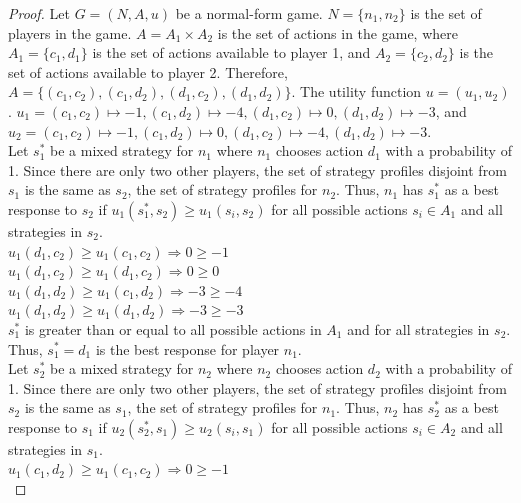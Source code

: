 \begin{proof}
  Let $G=(N, A, u)$ be a normal-form game. $N = \{n_1, n_2\}$ is the set of players in the game. $A=A_1\times A_2$ is the set of actions in the game, where $A_1=\{c_1, d_1\}$ is the set of actions available to player 1, and $A_2=\{c_2, d_2\}$ is the set of actions available to player 2. Therefore, $A=\{(c_1, c_2), (c_1, d_2), (d_1, c_2), (d_1, d_2)\}$. The utility function $u=(u_1, u_2)$. $u_1=(c_1, c_2)\mapsto -1, (c_1, d_2)\mapsto -4, (d_1, c_2)\mapsto 0, (d_1, d_2)\mapsto -3$, and $u_2=(c_1, c_2)\mapsto -1, (c_1, d_2)\mapsto 0, (d_1, c_2)\mapsto -4, (d_1, d_2)\mapsto -3$.\\

  Let $s^*_1$ be a mixed strategy for $n_1$ where $n_1$ chooses action $d_1$ with a probability of 1. Since there are only two other players, the set of strategy profiles disjoint from $s_1$ is the same as $s_2$, the set of strategy profiles for $n_2$. Thus, $n_1$ has $s^*_1$ as a best response to $s_2$ if $u_1(s^*_1, s_2)\ge u_1(s_i, s_2)$ for all possible actions $s_i\in A_1$ and all strategies in $s_2$.\\
  
  $u_1(d_1, c_2)\ge u_1(c_1, c_2) \Rightarrow 0\ge -1$\\
  
  $u_1(d_1, c_2)\ge u_1(d_1, c_2) \Rightarrow 0\ge 0$\\

  $u_1(d_1, d_2)\ge u_1(c_1, d_2) \Rightarrow -3\ge -4$\\

  $u_1(d_1, d_2)\ge u_1(d_1, d_2) \Rightarrow -3\ge -3$\\

  $s^*_1$ is greater than or equal to all possible actions in $A_1$ and for all strategies in $s_2$. Thus, $s^*_1=d_1$ is the best response for player $n_1$.\\

  Let $s^*_2$ be a mixed strategy for $n_2$ where $n_2$ chooses action $d_2$ with a probability of 1. Since there are only two other players, the set of strategy profiles disjoint from $s_2$ is the same as $s_1$, the set of strategy profiles for $n_1$. Thus, $n_2$ has $s^*_2$ as a best response to $s_1$ if $u_2(s^*_2, s_1)\ge u_2(s_i, s_1)$ for all possible actions $s_i\in A_2$ and all strategies in $s_1$.\\
  
  $u_1(c_1, d_2)\ge u_1(c_1, c_2) \Rightarrow 0\ge -1$\\


\end{proof}
